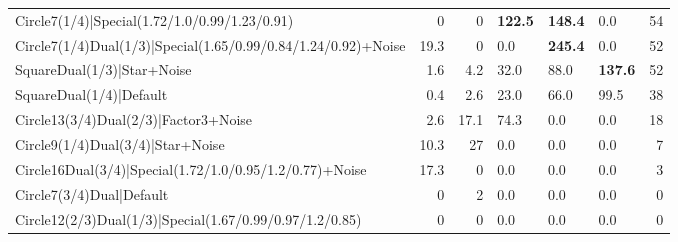 \begin{tabular}{lrrlllr}
 Circle7(1/4)|Special(1.72/1.0/0.99/1.23/0.91)                  &          0   &            0   & \textbf{122.5} & \textbf{148.4} & 0.0            &           54 \\
 Circle7(1/4)Dual(1/3)|Special(1.65/0.99/0.84/1.24/0.92)+Noise  &         19.3 &            0   & 0.0            & \textbf{245.4} & 0.0            &           52 \\
 SquareDual(1/3)|Star+Noise                                     &          1.6 &            4.2 & 32.0           & 88.0           & \textbf{137.6} &           52 \\
 SquareDual(1/4)|Default                                        &          0.4 &            2.6 & 23.0           & 66.0           & 99.5           &           38 \\
 Circle13(3/4)Dual(2/3)|Factor3+Noise                           &          2.6 &           17.1 & 74.3           & 0.0            & 0.0            &           18 \\
 Circle9(1/4)Dual(3/4)|Star+Noise                               &         10.3 &           27   & 0.0            & 0.0            & 0.0            &            7 \\
 Circle16Dual(3/4)|Special(1.72/1.0/0.95/1.2/0.77)+Noise        &         17.3 &            0   & 0.0            & 0.0            & 0.0            &            3 \\
 Circle7(3/4)Dual|Default                                       &          0   &            2   & 0.0            & 0.0            & 0.0            &            0 \\
 Circle12(2/3)Dual(1/3)|Special(1.67/0.99/0.97/1.2/0.85)        &          0   &            0   & 0.0            & 0.0            & 0.0            &            0 \\
\hline
\end{tabular}